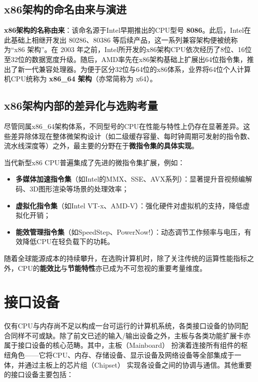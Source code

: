 \documentclass[12pt,UTF8]{ctexbook}
\begin{document}
\subsection{x86架构的命名由来与演进}

\textbf{x86架构的名称由来}：该命名源于Intel早期推出的CPU型号 \textbf{8086}。此后，Intel在此基础上相继开发出 80286、80386 等后续产品，这一系列兼容架构便被统称为“x86 架构”。在 2003 年之前，Intel所开发的x86架构CPU依次经历了8位、16位至32位的数据宽度升级。随后，AMD率先在x86架构基础上扩展出64位指令集，推出了新一代兼容处理器。为便于区分32位与64位的x86体系，业界将64位个人计算机CPU统称为 \textbf{x86\_64 架构}（亦常简称为 x64）。

\subsection{x86架构内部的差异化与选购考量}

尽管同属x86\_64架构体系，不同型号的CPU在性能与特性上仍存在显著差异。这些差异除体现在整体微架构设计（如二级缓存容量、每时钟周期可发射的指令数、流水线深度等）之外，最主要的分野在于\textbf{微指令集的具体实现}。

当代新型x86 CPU普遍集成了先进的微指令集扩展，例如：

\begin{itemize}
\item \textbf{多媒体加速指令集}（如Intel的MMX、SSE、AVX系列）：显著提升音视频编解码、3D图形渲染等场景的处理效率；
\item \textbf{虚拟化指令集}（如Intel VT-x、AMD-V）：强化硬件对虚拟机的支持，降低虚拟化开销；
\item \textbf{能效管理指令集}（如SpeedStep、PowerNow!）：动态调节工作频率与电压，有效降低CPU在轻负载下的功耗。
\end{itemize}

随着全球能源成本的持续攀升，在选购计算机时，除了关注传统的运算性能指标之外，CPU的\textbf{能效比}与\textbf{节能特性}亦已成为不可忽视的重要考量维度。

\section{接口设备}

仅有CPU与内存尚不足以构成一台可运行的计算机系统，各类接口设备的协同配合同样不可或缺。除了前文已述的输入/输出设备之外，主板与各类功能扩展卡亦属于接口设备的核心范畴。其中，主板（Mainboard） 扮演着连接所有组件的枢纽角色——它将CPU、内存、存储设备、显示设备及网络设备等全部集成于一体，并通过主板上的芯片组（Chipset） 实现各设备之间的协调与通信。其他重要的接口设备主要包括：
\end{document}
